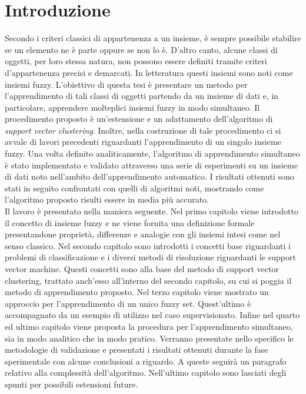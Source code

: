 \documentclass [11pt,a4paper,twoside,openright] {book}
\begin{document}
\chapter*{Introduzione}
Secondo i criteri classici di appartenenza a un insieme, è sempre possibile stabilire se un elemento ne è parte oppure se non lo è. D'altro canto, alcune classi di oggetti, per loro stessa natura, non possono essere definiti tramite criteri d'appartenenza precisi e demarcati. In letteratura questi insiemi sono noti come insiemi fuzzy. L'obiettivo di questa tesi è presentare un metodo per l'apprendimento di tali classi di oggetti partendo da un insieme di dati e, in particolare, apprendere molteplici insiemi fuzzy in modo simultaneo. Il procedimento proposto è un'estensione e un adattamento dell'algoritmo di \textit{support vector clustering}. Inoltre, nella costruzione di tale procedimento ci si avvale di lavori precedenti riguardanti l'apprendimento di un singolo insieme fuzzy. Una volta definito analiticamente, l'algoritmo di apprendimento simultaneo è stato implementato e validato attraverso una serie di esperimenti su un insieme di dati noto nell'ambito dell'apprendimento automatico. I risultati ottenuti sono stati in seguito confrontati con quelli di algoritmi noti, mostrando come l'algoritmo proposto risulti essere in media più accurato.\\
Il lavoro è presentato nella maniera seguente. Nel primo capitolo viene introdotto il concetto di insieme fuzzy e ne viene fornita una definizione formale presentandone proprietà, differenze e analogie con gli insiemi intesi come nel senso classico. Nel secondo capitolo sono introdotti i concetti base riguardanti i problemi di classificazione e i diversi metodi di risoluzione riguardanti le support vector machine. Questi concetti sono alla base del metodo di support vector clustering, trattato anch'esso all'interno del secondo capitolo, su cui si poggia il metodo di apprendimento proposto. Nel terzo capitolo viene mostrato un approccio per l'apprendimento di un unico fuzzy set. Quest'ultimo è accompagnato da un esempio di utilizzo nel caso supervisionato. Infine nel quarto ed ultimo capitolo viene proposta la procedura per l'apprendimento simultaneo, sia in modo analitico che in modo pratico. Verranno presentate nello specifico le metodologie di validazione e presentati i risultati ottenuti durante la fase sperimentale con alcune conclusioni a riguardo. A queste seguirà un paragrafo relativo alla complessità dell'algoritmo. Nell'ultimo capitolo sono lasciati degli spunti per possibili estensioni future.
\end{document}

